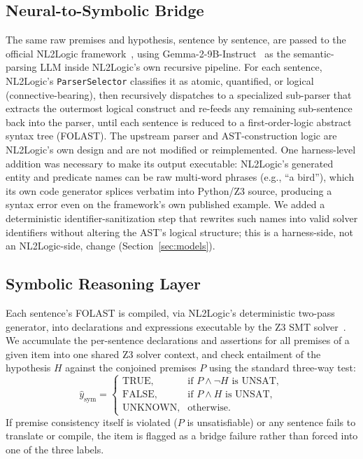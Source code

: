 \documentclass[conference]{IEEEtran}
\begin{document}
\subsection{Neural-to-Symbolic Bridge}
The same raw premises and hypothesis, sentence by sentence, are passed to the official NL2Logic framework~\cite{putra2026nl2logic}, using Gemma-2-9B-Instruct~\cite{gemma2report} as the semantic-parsing LLM inside NL2Logic's own recursive pipeline. For each sentence, NL2Logic's \texttt{ParserSelector} classifies it as atomic, quantified, or logical (connective-bearing), then recursively dispatches to a specialized sub-parser that extracts the outermost logical construct and re-feeds any remaining sub-sentence back into the parser, until each sentence is reduced to a first-order-logic abstract syntax tree (FOLAST). The upstream parser and AST-construction logic are NL2Logic's own design and are not modified or reimplemented. One harness-level addition was necessary to make its output executable: NL2Logic's generated entity and predicate names can be raw multi-word phrases (e.g., ``a bird''), which its own code generator splices verbatim into Python/Z3 source, producing a syntax error even on the framework's own published example. We added a deterministic identifier-sanitization step that rewrites such names into valid solver identifiers without altering the AST's logical structure; this is a harness-side, not an NL2Logic-side, change (Section~\ref{sec:models}).

\subsection{Symbolic Reasoning Layer}
Each sentence's FOLAST is compiled, via NL2Logic's deterministic two-pass generator, into declarations and expressions executable by the Z3 SMT solver~\cite{demoura2008z3}. We accumulate the per-sentence declarations and assertions for all premises of a given item into one shared Z3 solver context, and check entailment of the hypothesis $H$ against the conjoined premises $P$ using the standard three-way test:
\begin{equation}
\hat y_{\text{sym}} =
\begin{cases}
\text{TRUE}, & \text{if } P \wedge \neg H \text{ is UNSAT},\\
\text{FALSE}, & \text{if } P \wedge H \text{ is UNSAT},\\
\text{UNKNOWN}, & \text{otherwise.}
\end{cases}
\label{eq:verdict}
\end{equation}
If premise consistency itself is violated ($P$ is unsatisfiable) or any sentence fails to translate or compile, the item is flagged as a bridge failure rather than forced into one of the three labels.
\end{document}
